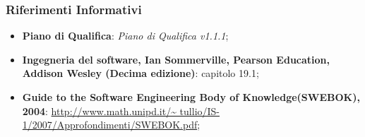 		\subsubsection{Riferimenti Informativi}
			\begin{itemize}
				\item \textbf{Piano di Qualifica}: \textit{Piano di Qualifica v1.1.1};
				\item \textbf{Ingegneria del software, Ian Sommerville, Pearson Education, Addison Wesley (Decima edizione)}: capitolo 19.1;
				\item \textbf{Guide to the Software Engineering Body of Knowledge(SWEBOK), 2004}: \url{http://www.math.unipd.it/~	tullio/IS-1/2007/Approfondimenti/SWEBOK.pdf};
			\end{itemize}
